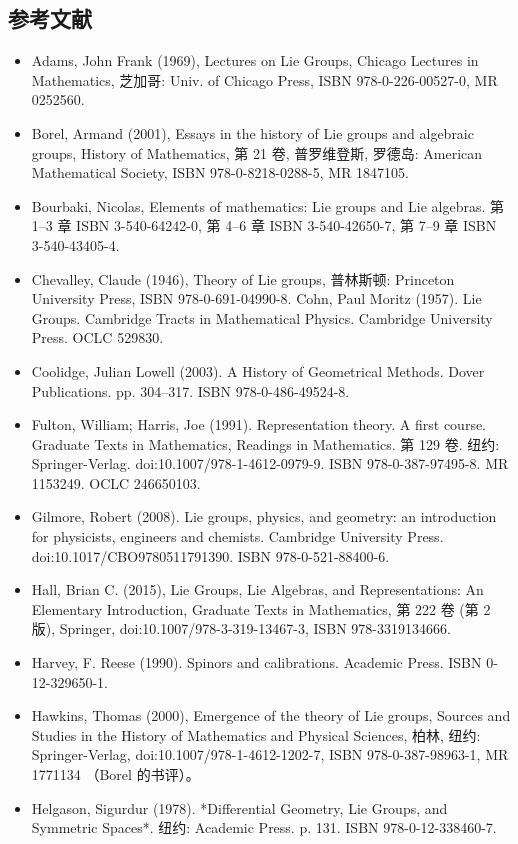 \subsection{参考文献}
\begin{itemize}
\item Adams, John Frank (1969), Lectures on Lie Groups, Chicago Lectures in Mathematics, 芝加哥: Univ. of Chicago Press, ISBN 978-0-226-00527-0, MR 0252560.
\item Borel, Armand (2001), Essays in the history of Lie groups and algebraic groups, History of Mathematics, 第 21 卷, 普罗维登斯, 罗德岛: American Mathematical Society, ISBN 978-0-8218-0288-5, MR 1847105.
\item Bourbaki, Nicolas, Elements of mathematics: Lie groups and Lie algebras. 第 1–3 章 ISBN 3-540-64242-0, 第 4–6 章 ISBN 3-540-42650-7, 第 7–9 章 ISBN 3-540-43405-4.
\item Chevalley, Claude (1946), Theory of Lie groups, 普林斯顿: Princeton University Press, ISBN 978-0-691-04990-8.
Cohn, Paul Moritz (1957). Lie Groups. Cambridge Tracts in Mathematical Physics. Cambridge University Press. OCLC 529830.
\item Coolidge, Julian Lowell (2003). A History of Geometrical Methods. Dover Publications. pp. 304–317. ISBN 978-0-486-49524-8.
\item Fulton, William; Harris, Joe (1991). Representation theory. A first course. Graduate Texts in Mathematics, Readings in Mathematics. 第 129 卷. 纽约: Springer-Verlag. doi:10.1007/978-1-4612-0979-9. ISBN 978-0-387-97495-8. MR 1153249. OCLC 246650103.
\item Gilmore, Robert (2008). Lie groups, physics, and geometry: an introduction for physicists, engineers and chemists. Cambridge University Press. doi:10.1017/CBO9780511791390. ISBN 978-0-521-88400-6.
\item Hall, Brian C. (2015), Lie Groups, Lie Algebras, and Representations: An Elementary Introduction, Graduate Texts in Mathematics, 第 222 卷 (第 2 版), Springer, doi:10.1007/978-3-319-13467-3, ISBN 978-3319134666.
\item Harvey, F. Reese (1990). Spinors and calibrations. Academic Press. ISBN 0-12-329650-1.
\item Hawkins, Thomas (2000), Emergence of the theory of Lie groups, Sources and Studies in the History of Mathematics and Physical Sciences, 柏林, 纽约: Springer-Verlag, doi:10.1007/978-1-4612-1202-7, ISBN 978-0-387-98963-1, MR 1771134 （Borel 的书评）。
\item Helgason, Sigurdur (1978). *Differential Geometry, Lie Groups, and Symmetric Spaces*. 纽约: Academic Press. p. 131. ISBN 978-0-12-338460-7.

\end{itemize}
